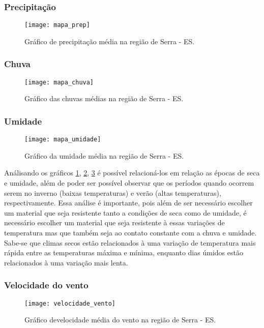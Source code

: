 \subsubsection{Precipitação}

\begin{figure}[H]
	\texttt{[image: mapa\_prep]}
	\centering
	\caption{Gráfico de precipitação média na região de Serra - ES.}
	\label{mapa_prep}
\end{figure}

\subsubsection{Chuva}
\begin{figure}[H]
	\texttt{[image: mapa\_chuva]}
	\centering
	\caption{Gráfico das chuvas médias na região de Serra - ES.}
	\label{mapa_chuva}
\end{figure}
\subsubsection{Umidade}
\begin{figure}[H]
	\texttt{[image: mapa\_umidade]}
	\centering
	\caption{Gráfico da umidade média na região de Serra - ES.}
	\label{mapa_umidade}
\end{figure}

Análisando os gráficos \ref{mapa_prep}, \ref{mapa_chuva}, \ref{mapa_umidade} é possível relacioná-los em relação as épocas de seca e umidade, além de poder ser possível observar que os períodos quando ocorrem serem no inverno (baixas temperaturas) e verão (altas temperaturas), respectivamente. Essa análise é importante, pois além de ser necessário escolher um material que seja resistente tanto a condições de seca como de umidade, é necessário escolher um material que seja resistente à essas variações de temperatura mas que também seja ao contato constante com a chuva e umidade. Sabe-se que climas secos estão relacionados à uma variação de temperatura mais rápida entre as temperaturas máxima e mínima, enquanto dias úmidos estão relacionados à uma variação mais lenta.
 
\subsubsection{Velocidade do vento}

\begin{figure}[H]
	\texttt{[image: velocidade\_vento]}
	\centering
	\caption{Gráfico develocidade média do vento na região de Serra - ES.}
	\label{vel_vento}
\end{figure}


